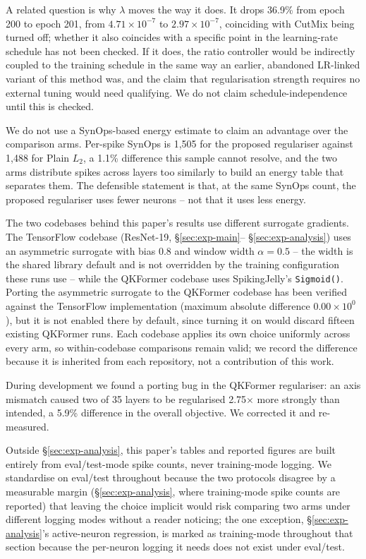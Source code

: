 A related question is why $\lambda$ moves the way it does. It drops 36.9\% from
epoch 200 to epoch 201, from $4.71\times10^{-7}$ to $2.97\times10^{-7}$,
coinciding with CutMix being turned off; whether it also coincides with a
specific point in the learning-rate schedule has not been checked. If it does, the ratio
controller would be indirectly coupled to the training schedule in the same
way an earlier, abandoned LR-linked variant of this method was, and the
claim that regularisation strength requires no external tuning would need
qualifying. We do not claim schedule-independence until this is checked.

We do not use a SynOps-based energy estimate to claim an advantage over the
comparison arms. Per-spike SynOps is 1,505 for the proposed regulariser
against 1,488 for Plain $L_2$, a 1.1\% difference this sample cannot resolve,
and the two arms distribute spikes across layers too similarly to build an
energy table that separates them. The defensible statement is that, at the
same SynOps count, the proposed regulariser uses fewer neurons -- not that it
uses less energy.

The two codebases behind this paper's results use different surrogate
gradients. The TensorFlow codebase (ResNet-19, \S\ref{sec:exp-main}--%
\S\ref{sec:exp-analysis}) uses an asymmetric surrogate with bias 0.8 and
window width $\alpha=0.5$ -- the width is the shared library default and is
not overridden by the training configuration these runs use -- while the
QKFormer codebase uses SpikingJelly's \texttt{Sigmoid()}. Porting the
asymmetric surrogate to the QKFormer codebase has been verified against the
TensorFlow implementation (maximum absolute difference $0.00\times10^{0}$),
but it is not enabled there by default, since turning it on would discard
fifteen existing QKFormer runs. Each codebase applies its own choice
uniformly across every arm, so within-codebase comparisons remain valid; we
record the difference because it is inherited from each repository, not a
contribution of this work.

During development we found a porting bug in the QKFormer regulariser: an
axis mismatch caused two of 35 layers to be regularised 2.75$\times$ more
strongly than intended, a 5.9\% difference in the overall objective. We
corrected it and re-measured.

Outside \S\ref{sec:exp-analysis}, this paper's tables and reported figures
are built entirely from eval/test-mode spike counts, never training-mode
logging. We standardise on eval/test throughout because the two protocols
disagree by a measurable margin
(\S\ref{sec:exp-analysis}, where training-mode spike counts are reported) that leaving the choice implicit would risk comparing
two arms under different logging modes without a reader noticing; the one
exception, \S\ref{sec:exp-analysis}'s
active-neuron regression, is marked as training-mode throughout that section
because the per-neuron logging it needs does not exist under eval/test.

